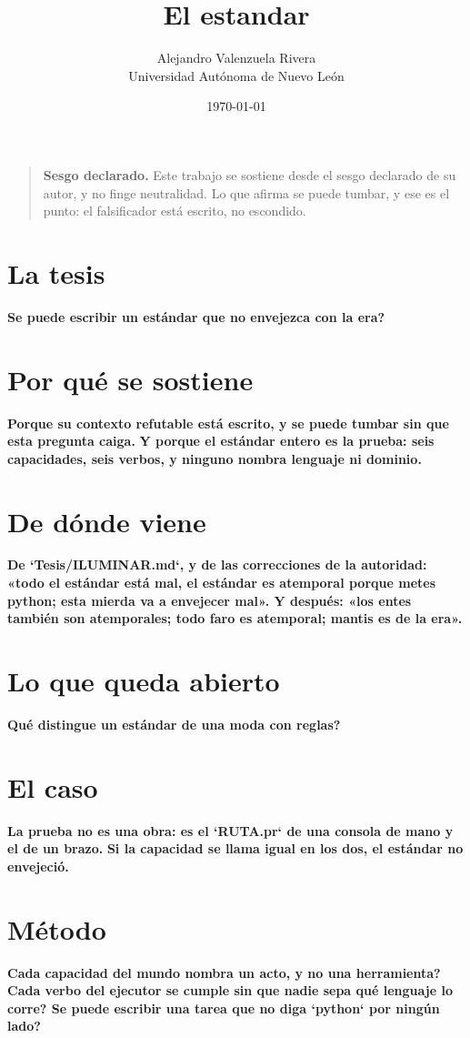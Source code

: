 \documentclass[11pt,a4paper]{article}
\title{El estandar}
\author{Alejandro Valenzuela Rivera\\\small Universidad Autónoma de Nuevo León}
\date{\today}
\begin{document}
\maketitle

\begin{quote}
\textbf{Sesgo declarado.} Este trabajo se sostiene desde el sesgo declarado de su autor, y no finge neutralidad. Lo que afirma se puede tumbar, y ese es el punto: el falsificador está escrito, no escondido.
\end{quote}

\section{La tesis}
\textbf{\textquestiondown{}Se puede escribir un estándar que no envejezca con la era?}

\section{Por qué se sostiene}
\textbf{Porque su contexto refutable está escrito, y se puede tumbar sin que esta pregunta caiga.} \textbf{Y porque el estándar entero es la prueba: seis capacidades, seis verbos, y ninguno nombra lenguaje ni dominio.}

\section{De dónde viene}
\textbf{De `Tesis/ILUMINAR.md`, y de las correcciones de la autoridad: «todo el estándar está mal, el estándar es atemporal porque metes python; esta mierda va a envejecer mal». Y después: «los entes también son atemporales; todo faro es atemporal; mantis es de la era».}

\section{Lo que queda abierto}
\textbf{\textquestiondown{}Qué distingue un estándar de una moda con reglas?}

\section{El caso}
\textbf{La prueba no es una obra: es el `RUTA.pr` de una consola de mano y el de un brazo.} \textbf{Si la capacidad se llama igual en los dos, el estándar no envejeció.}

\section{Método}
\textbf{\textquestiondown{}Cada capacidad del mundo nombra un acto, y no una herramienta? \textquestiondown{}Cada verbo del ejecutor se cumple sin que nadie sepa qué lenguaje lo corre? \textquestiondown{}Se puede escribir una tarea que no diga `python` por ningún lado?}
\end{document}

